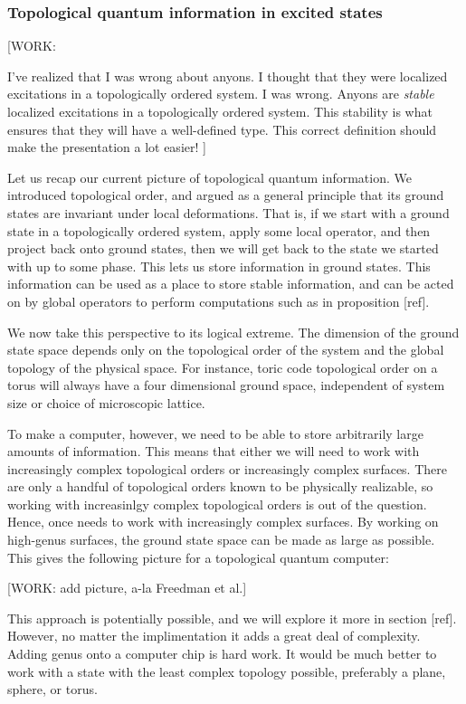 \subsubsection{Topological quantum information in excited states}

[WORK:

I've realized that I was wrong about anyons. I thought that they were localized excitations in a topologically ordered system. I was wrong. Anyons are \textit{stable} localized excitations in a topologically ordered system. This stability is what ensures that they will have a well-defined type. This correct definition should make the presentation a lot easier!
]

Let us recap our current picture of topological quantum information. We introduced topological order, and argued as a general principle that its ground states are invariant under local deformations. That is, if we start with a ground state in a topologically ordered system, apply some local operator, and then project back onto ground states, then we will get back to the state we started with up to some phase. This lets us store information in ground states. This information can be used as a place to store stable information, and can be acted on by global operators to perform computations such as in proposition [ref].

We now take this perspective to its logical extreme. The dimension of the ground state space depends only on the topological order of the system and the global topology of the physical space. For instance, toric code topological order on a torus will always have a four dimensional ground space, independent of system size or choice of microscopic lattice.

To make a computer, however, we need to be able to store arbitrarily large amounts of information. This means that either we will need to work with increasingly complex topological orders or increasingly complex surfaces. There are only a handful of topological orders known to be physically realizable, so working with increasinlgy complex topological orders is out of the question. Hence, once needs to work with increasingly complex surfaces. By working on high-genus surfaces, the ground state space can be made as large as possible. This gives the following picture for a topological quantum computer:

[WORK: add picture, a-la Freedman et al.]

This approach is potentially possible, and we will explore it more in section [ref]. However, no matter the implimentation it adds a great deal of complexity. Adding genus onto a computer chip is hard work. It would be much better to work with a state with the least complex topology possible, preferably a plane, sphere, or torus.

